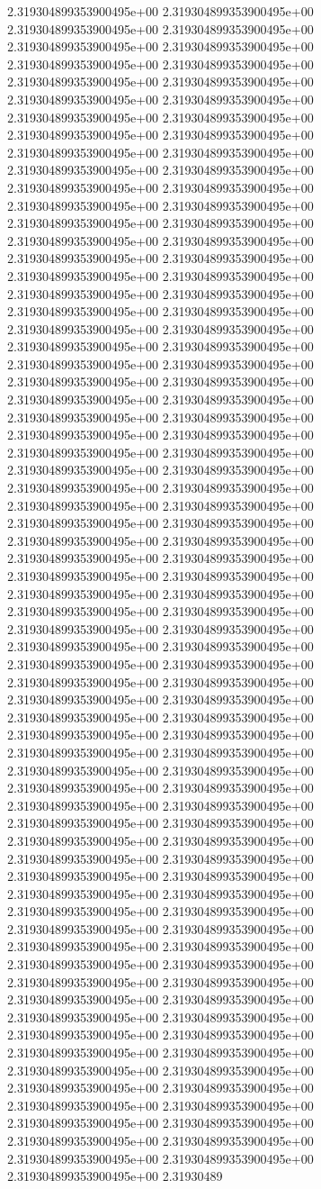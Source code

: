 	2.319304899353900495e+00	2.319304899353900495e+00	2.319304899353900495e+00	2.319304899353900495e+00	2.319304899353900495e+00	2.319304899353900495e+00	2.319304899353900495e+00	2.319304899353900495e+00	2.319304899353900495e+00	2.319304899353900495e+00	2.319304899353900495e+00	2.319304899353900495e+00	2.319304899353900495e+00	2.319304899353900495e+00	2.319304899353900495e+00	2.319304899353900495e+00	2.319304899353900495e+00	2.319304899353900495e+00	2.319304899353900495e+00	2.319304899353900495e+00	2.319304899353900495e+00	2.319304899353900495e+00	2.319304899353900495e+00	2.319304899353900495e+00	2.319304899353900495e+00	2.319304899353900495e+00	2.319304899353900495e+00	2.319304899353900495e+00	2.319304899353900495e+00	2.319304899353900495e+00	2.319304899353900495e+00	2.319304899353900495e+00	2.319304899353900495e+00	2.319304899353900495e+00	2.319304899353900495e+00	2.319304899353900495e+00	2.319304899353900495e+00	2.319304899353900495e+00	2.319304899353900495e+00	2.319304899353900495e+00	2.319304899353900495e+00	2.319304899353900495e+00	2.319304899353900495e+00	2.319304899353900495e+00	2.319304899353900495e+00	2.319304899353900495e+00	2.319304899353900495e+00	2.319304899353900495e+00	2.319304899353900495e+00	2.319304899353900495e+00	2.319304899353900495e+00	2.319304899353900495e+00	2.319304899353900495e+00	2.319304899353900495e+00	2.319304899353900495e+00	2.319304899353900495e+00	2.319304899353900495e+00	2.319304899353900495e+00	2.319304899353900495e+00	2.319304899353900495e+00	2.319304899353900495e+00	2.319304899353900495e+00	2.319304899353900495e+00	2.319304899353900495e+00	2.319304899353900495e+00	2.319304899353900495e+00	2.319304899353900495e+00	2.319304899353900495e+00	2.319304899353900495e+00	2.319304899353900495e+00	2.319304899353900495e+00	2.319304899353900495e+00	2.319304899353900495e+00	2.319304899353900495e+00	2.319304899353900495e+00	2.319304899353900495e+00	2.319304899353900495e+00	2.319304899353900495e+00	2.319304899353900495e+00	2.319304899353900495e+00	2.319304899353900495e+00	2.319304899353900495e+00	2.319304899353900495e+00	2.319304899353900495e+00	2.319304899353900495e+00	2.319304899353900495e+00	2.319304899353900495e+00	2.319304899353900495e+00	2.319304899353900495e+00	2.319304899353900495e+00	2.319304899353900495e+00	2.319304899353900495e+00	2.319304899353900495e+00	2.319304899353900495e+00	2.319304899353900495e+00	2.319304899353900495e+00	2.319304899353900495e+00	2.319304899353900495e+00	2.319304899353900495e+00	2.319304899353900495e+00	2.319304899353900495e+00	2.319304899353900495e+00	2.319304899353900495e+00	2.319304899353900495e+00	2.319304899353900495e+00	2.319304899353900495e+00	2.319304899353900495e+00	2.319304899353900495e+00	2.319304899353900495e+00	2.319304899353900495e+00	2.319304899353900495e+00	2.319304899353900495e+00	2.319304899353900495e+00	2.319304899353900495e+00	2.319304899353900495e+00	2.319304899353900495e+00	2.319304899353900495e+00	2.319304899353900495e+00	2.319304899353900495e+00	2.319304899353900495e+00	2.319304899353900495e+00	2.319304899353900495e+00	2.319304899353900495e+00	2.319304899353900495e+00	2.319304899353900495e+00	2.319304899353900495e+00	2.319304899353900495e+00	2.319304899353900495e+00	2.319304899353900495e+00	2.319304899353900495e+00	2.319304899353900495e+00	2.319304899353900495e+00	2.319304899353900495e+00	2.31930489